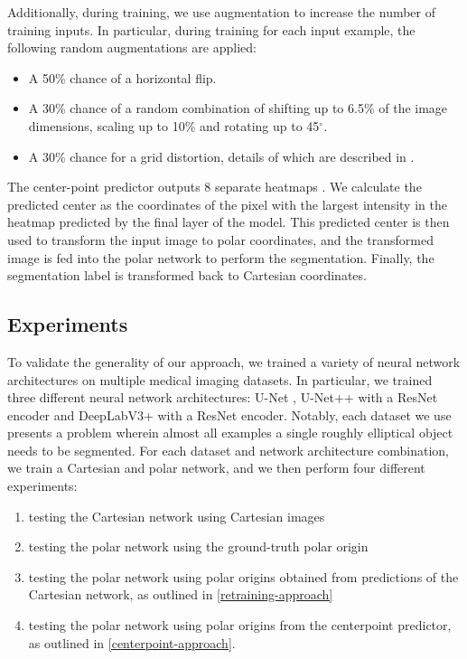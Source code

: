 \clearpage

Additionally, during training, we use augmentation to increase the number of training inputs. In 
particular, during training for each input example, the following random augmentations are applied:

\begin{itemize}
  \item A 50\% chance of a horizontal flip.
  \item A 30\% chance of a random combination of shifting up to 6.5\% of the image dimensions, scaling up 
    to 10\% and rotating up to 45$^{\circ}$.
  \item A 30\% chance for a grid distortion, details of which are described in \cite{info11020125}.
\end{itemize}

The center-point predictor outputs 8 separate heatmaps \cite{newellStackedHourglassNetworks2016}. We
calculate the predicted center as the coordinates of the pixel with the largest intensity in the heatmap
predicted by the final layer of the model. This predicted center is then used to transform the input
image to polar coordinates, and the transformed image is fed into the polar network to perform
the segmentation. Finally, the segmentation label is transformed back to Cartesian coordinates.
    
  \subsection{Experiments} \label{experiments}
  
To validate the generality of our approach, we trained a variety of neural network architectures on 
multiple medical imaging datasets. In particular, we trained three different neural network 
architectures: U-Net \cite{ronnebergerUNetConvolutionalNetworks2015}, U-Net++ 
\cite{zhouUNetNestedUNet2018a} with a ResNet encoder and DeepLabV3+ 
\cite{chenEncoderDecoderAtrousSeparable2018a} with a ResNet encoder. Notably, each dataset we use presents a problem wherein almost all examples a single roughly elliptical object needs to be segmented. 
For each dataset and network architecture combination, we train a Cartesian and polar network, and we then 
perform four different experiments: 

\begin{enumerate}
	\item{testing the Cartesian network using Cartesian images}
	\item{testing the polar network using the ground-truth polar origin}
	\item{testing the polar network using polar origins obtained from predictions of the Cartesian network, as outlined in \ref{retraining-approach}}
	\item{testing the polar network using polar origins from the centerpoint predictor, as outlined in \ref{centerpoint-approach}}.
\end{enumerate}

